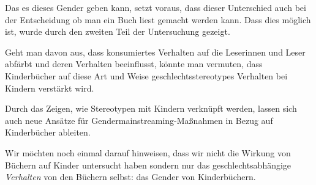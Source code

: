 Das es dieses Gender geben kann, setzt voraus, dass dieser Unterschied
auch bei der Entscheidung ob man ein Buch liest gemacht werden kann.
Dass dies möglich ist, wurde durch den zweiten Teil der Untersuchung
gezeigt.

Geht man davon aus, dass konsumiertes Verhalten auf die Leserinnen und
Leser abfärbt und deren Verhalten beeinflusst, könnte man vermuten, dass
Kinderbücher auf diese Art und Weise geschlechtsstereotypes Verhalten
bei Kindern verstärkt wird.

Durch das Zeigen, wie Stereotypen mit Kindern verknüpft werden, lassen
sich auch neue Ansätze für Gendermainstreaming-Maßnahmen in Bezug auf
Kinderbücher ableiten.

Wir möchten noch einmal darauf hinweisen, dass wir nicht die Wirkung von
Büchern auf Kinder untersucht haben sondern nur das geschlechtsabhängige
\emph{Verhalten} von den Büchern selbst: das Gender von Kinderbüchern.
